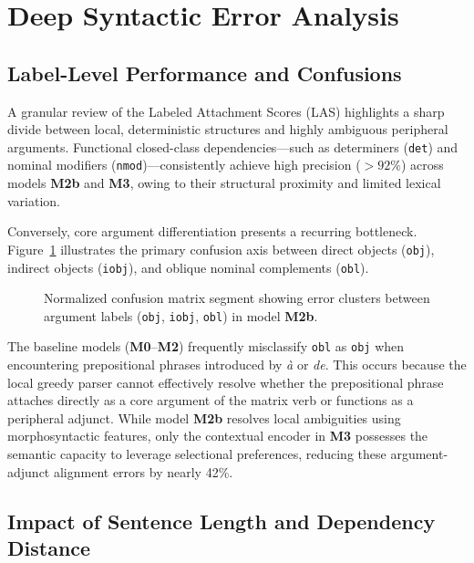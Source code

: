 \documentclass[12pt,a4paper]{article}
\begin{document}
\section{Deep Syntactic Error Analysis}
\label{sec:deep_syntactic_error_analysis}

\subsection{Label-Level Performance and Confusions}
\label{subsec:label_level_performance}

A granular review of the Labeled Attachment Scores (LAS) highlights a sharp divide between local, deterministic structures and highly ambiguous peripheral arguments. 
Functional closed-class dependencies—such as determiners (\texttt{det}) and nominal modifiers (\texttt{nmod})—consistently achieve high precision ($>92\%$) across models \textbf{M2b} and \textbf{M3}, owing to their structural proximity and limited lexical variation.

Conversely, core argument differentiation presents a recurring bottleneck. Figure~\ref{fig:confusion_matrix_snippet} illustrates the primary confusion axis between direct objects (\texttt{obj}), indirect objects (\texttt{iobj}), and oblique nominal complements (\texttt{obl}). 

\begin{figure}[htbp]
\centering
\caption{Normalized confusion matrix segment showing error clusters between argument labels (\texttt{obj}, \texttt{iobj}, \texttt{obl}) in model \textbf{M2b}.}
\label{fig:confusion_matrix_snippet}
\end{figure}

The baseline models (\textbf{M0}--\textbf{M2}) frequently misclassify \texttt{obl} as \texttt{obj} when encountering prepositional phrases introduced by \textit{à} or \textit{de}. This occurs because the local greedy parser cannot effectively resolve whether the prepositional phrase attaches directly as a core argument of the matrix verb or functions as a peripheral adjunct. While model \textbf{M2b} resolves local ambiguities using morphosyntactic features, only the contextual encoder in \textbf{M3} possesses the semantic capacity to leverage selectional preferences, reducing these argument-adjunct alignment errors by nearly 42\%.

\subsection{Impact of Sentence Length and Dependency Distance}
\label{subsec:sentence_length_distance}
\end{document}
